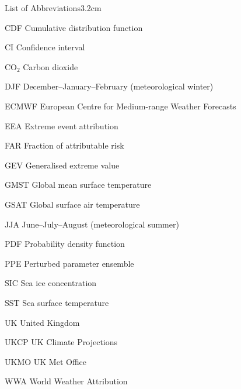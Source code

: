 \begin{mclistof}{List of Abbreviations}{3.2cm}

    \item[CDF] Cumulative distribution function
    \item[CI] Confidence interval 
    \item[CO$_2$] Carbon dioxide
    \item[DJF] December--January--February (meteorological winter)
    \item[ECMWF] European Centre for Medium-range Weather Forecasts
    \item[EEA] Extreme event attribution
    \item[FAR] Fraction of attributable risk
    \item[GEV] Generalised extreme value
    \item[GMST] Global mean surface temperature
    \item[GSAT] Global surface air temperature
    \item[JJA] June--July--August (meteorological summer)
    \item[PDF] Probability density function
    \item[PPE] Perturbed parameter ensemble
    \item[SIC] Sea ice concentration
    \item[SST] Sea surface temperature
    \item[UK] United Kingdom
    \item[UKCP] UK Climate Projections
    \item[UKMO] UK Met Office
    \item[WWA] World Weather Attribution

\end{mclistof}